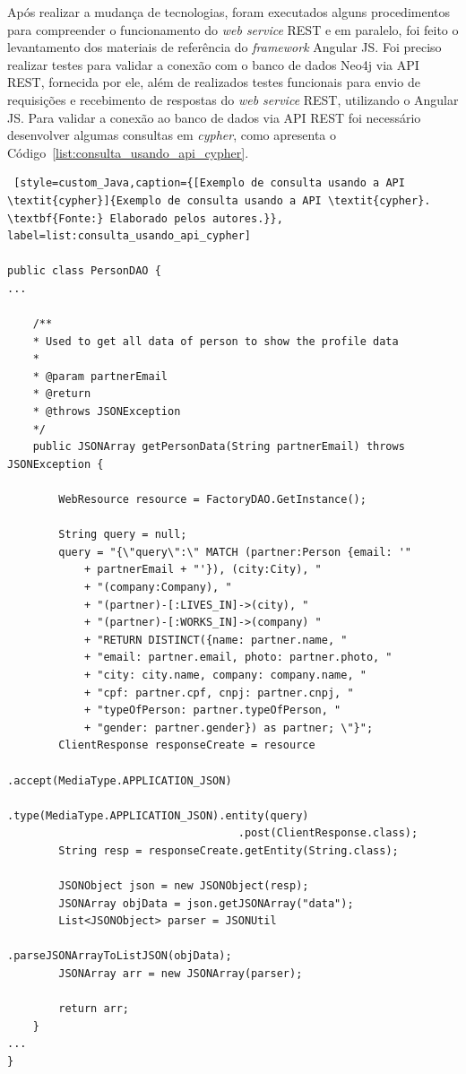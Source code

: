 
\par Após realizar a mudança de tecnologias, foram executados alguns procedimentos para compreender o funcionamento do \textit{web service} REST e em paralelo, foi feito o levantamento dos materiais de referência do \textit{framework} Angular JS. Foi preciso realizar testes para validar a conexão com o banco de dados Neo4j via API REST, fornecida por ele, além de realizados testes funcionais para envio de requisições e recebimento de respostas do \textit{web service} REST, utilizando o Angular JS. Para validar a conexão ao banco de dados via API REST foi necessário desenvolver algumas consultas em \textit{cypher}, como apresenta o Código~\ref{list:consulta_usando_api_cypher}.

\begin{lstlisting} [style=custom_Java,caption={[Exemplo de consulta usando a API \textit{cypher}]{Exemplo de consulta usando a API \textit{cypher}. \textbf{Fonte:} Elaborado pelos autores.}}, label=list:consulta_usando_api_cypher] 	

public class PersonDAO {
...

	/**
	* Used to get all data of person to show the profile data
	* 
	* @param partnerEmail
	* @return
	* @throws JSONException 
	*/
	public JSONArray getPersonData(String partnerEmail) throws JSONException {
		
		WebResource resource = FactoryDAO.GetInstance();
		
		String query = null;
		query = "{\"query\":\" MATCH (partner:Person {email: '"
			+ partnerEmail + "'}), (city:City), "
			+ "(company:Company), "
			+ "(partner)-[:LIVES_IN]->(city), "
			+ "(partner)-[:WORKS_IN]->(company) "
			+ "RETURN DISTINCT({name: partner.name, "
			+ "email: partner.email, photo: partner.photo, " 
			+ "city: city.name, company: company.name, " 
			+ "cpf: partner.cpf, cnpj: partner.cnpj, " 
			+ "typeOfPerson: partner.typeOfPerson, " 
			+ "gender: partner.gender}) as partner; \"}";
		ClientResponse responseCreate = resource
									.accept(MediaType.APPLICATION_JSON)
									.type(MediaType.APPLICATION_JSON).entity(query)
									.post(ClientResponse.class);
		String resp = responseCreate.getEntity(String.class);
		
		JSONObject json = new JSONObject(resp);
		JSONArray objData = json.getJSONArray("data");
		List<JSONObject> parser = JSONUtil
												.parseJSONArrayToListJSON(objData);
		JSONArray arr = new JSONArray(parser);
		
		return arr;
	}
...
}
\end{lstlisting}

